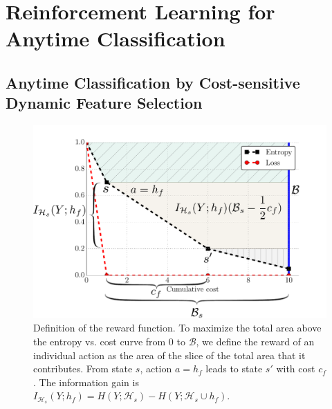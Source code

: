 \chapter{Reinforcement Learning for Anytime Classification}

\section{Anytime Classification by Cost-sensitive Dynamic Feature Selection}

\begin{figure}[ht]
\includegraphics[width=1\linewidth]{../../figures/rewards.pdf}
\caption{
Definition of the reward function.
To maximize the total area above the entropy vs. cost curve from $0$ to $\mathcal{B}$, we define the reward of an individual action as the area of the slice of the total area that it contributes.
From state $s$, action $a = h_f$ leads to state $s'$ with cost $c_f$.
The information gain is $I_{\mathcal{H}_s}(Y; h_f) = H(Y; \mathcal{H}_s) - H(Y; \mathcal{H}_s \cup {h_f})$.
\label{fig:rewards}}
\end{figure}

